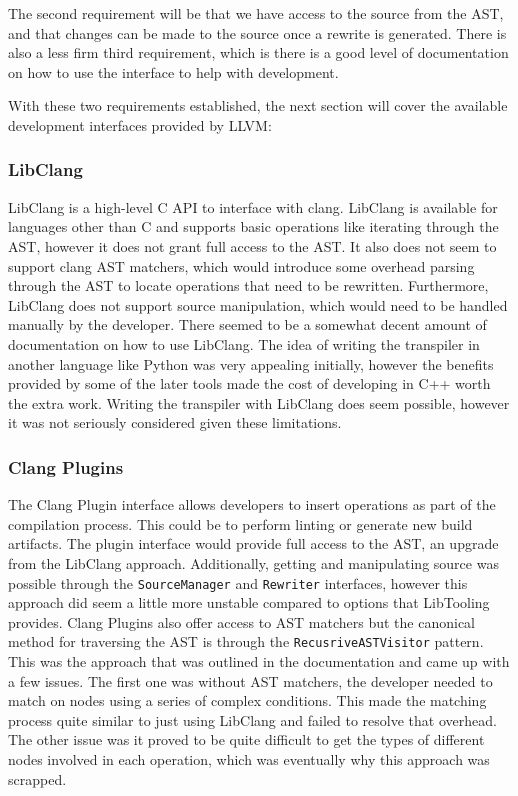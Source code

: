The second requirement will be that we have access to the source from the AST, and that changes can be made to the source once a rewrite is generated. There is also a less firm third requirement, which is there is a good level of documentation on how to use the interface to help with development.

With these two requirements established, the next section will cover the available development interfaces provided by LLVM:

\subsubsection{LibClang} 

LibClang is a high-level C API to interface with clang. LibClang is available for languages other than C and supports basic operations like iterating through the AST, however it does not grant full access to the AST. It also does not seem to support clang AST matchers, which would introduce some overhead parsing through the AST to locate operations that need to be rewritten. Furthermore, LibClang does not support source manipulation, which would need to be handled manually by the developer. There seemed to be a somewhat decent amount of documentation on how to use LibClang. The idea of writing the transpiler in another language like Python was very appealing initially, however the benefits provided by some of the later tools made the cost of developing in C++ worth the extra work. Writing the transpiler with LibClang does seem possible, however it was not seriously considered given these limitations.

\subsubsection{Clang Plugins}

The Clang Plugin interface allows developers to insert operations as part of the compilation process. This could be to perform linting or generate new build artifacts. The plugin interface would provide full access to the AST, an upgrade from the LibClang approach. Additionally, getting and manipulating source was possible through the \texttt{SourceManager} and \texttt{Rewriter} interfaces, however this approach did seem a little more unstable compared to options that LibTooling provides. Clang Plugins also offer access to AST matchers but the canonical method for traversing the AST is through the \texttt{RecusriveASTVisitor} pattern. This was the approach that was outlined in the documentation and came up with a few issues. The first one was without AST matchers, the developer needed to match on nodes using a series of complex conditions. This made the matching process quite similar to just using LibClang and failed to resolve that overhead. The other issue was it proved to be quite difficult to get the types of different nodes involved in each operation, which was eventually why this approach was scrapped.

